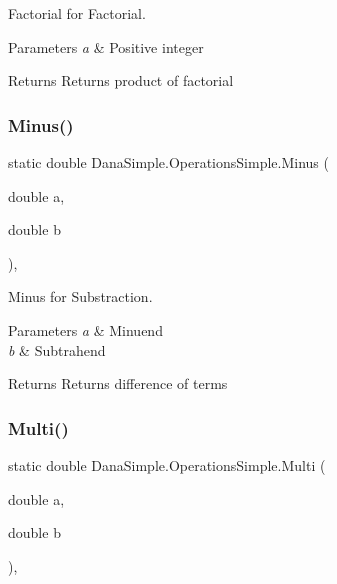 Factorial for Factorial. 


\begin{DoxyParams}{Parameters}
{\em a} & Positive integer \\
\hline
\end{DoxyParams}
\begin{DoxyReturn}{Returns}
Returns product of factorial 
\end{DoxyReturn}
\mbox{\label{classDanaSimple_1_1OperationsSimple_aeedd88ce3743db60d0d5d18d86ae2e23}} 
\subsubsection{\texorpdfstring{Minus()}{Minus()}}
{\footnotesize\ttfamily static double Dana\+Simple.\+Operations\+Simple.\+Minus (\begin{DoxyParamCaption}\item[{double}]{a,  }\item[{double}]{b }\end{DoxyParamCaption})\hspace{0.3cm}{\ttfamily [inline]}, {\ttfamily [static]}}



Minus for Substraction. 


\begin{DoxyParams}{Parameters}
{\em a} & Minuend \\
\hline
{\em b} & Subtrahend \\
\hline
\end{DoxyParams}
\begin{DoxyReturn}{Returns}
Returns difference of terms 
\end{DoxyReturn}
\mbox{\label{classDanaSimple_1_1OperationsSimple_a4894b899b1f8b881e6b44ebec8453151}} 
\subsubsection{\texorpdfstring{Multi()}{Multi()}}
{\footnotesize\ttfamily static double Dana\+Simple.\+Operations\+Simple.\+Multi (\begin{DoxyParamCaption}\item[{double}]{a,  }\item[{double}]{b }\end{DoxyParamCaption})\hspace{0.3cm}{\ttfamily [inline]}, {\ttfamily [static]}}



